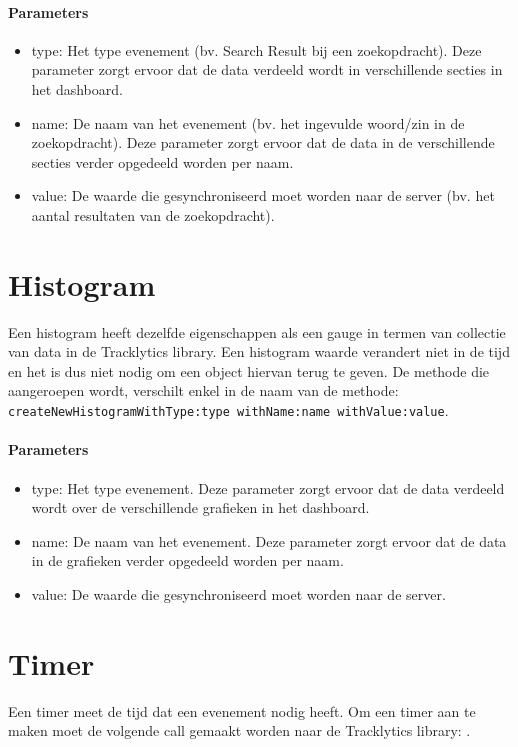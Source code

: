 \paragraph{Parameters}
\begin{itemize}
\item type: Het type evenement (bv. Search Result bij een zoekopdracht). Deze parameter zorgt ervoor dat de data verdeeld wordt in verschillende secties in het dashboard.
\item name: De naam van het evenement (bv. het ingevulde woord/zin in de zoekopdracht). Deze parameter zorgt ervoor dat de data in de verschillende secties verder opgedeeld worden per naam.
\item value: De waarde die gesynchroniseerd moet worden naar de server (bv. het aantal resultaten van de zoekopdracht).
\end{itemize}

\section{Histogram}
Een histogram heeft dezelfde eigenschappen als een gauge in termen van collectie van data in de Tracklytics library. Een histogram waarde verandert niet in de tijd en het is dus niet nodig om een object hiervan terug te geven. De methode die aangeroepen wordt, verschilt enkel in de naam van de methode: \texttt{\justify  createNewHistogramWithType:type withName:name withValue:value}. 

\paragraph{Parameters}
\begin{itemize}
\item type: Het type evenement. Deze parameter zorgt ervoor dat de data verdeeld wordt over de verschillende grafieken in het dashboard.
\item name: De naam van het evenement. Deze parameter zorgt ervoor dat de data in de grafieken verder opgedeeld worden per naam.
\item value: De waarde die gesynchroniseerd moet worden naar de server.
\end{itemize}

\section{Timer}
Een timer meet de tijd dat een evenement nodig heeft. Om een timer aan te maken moet de volgende call gemaakt worden naar de Tracklytics library: \texttt{}.

